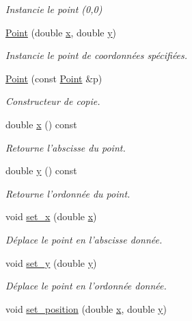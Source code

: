 \begin{DoxyCompactItemize}
\begin{DoxyCompactList}\small\item\em Instancie le point (0,0) \end{DoxyCompactList}\item 
\hyperlink{classPoint_a78b55e8d5466bb8c2cf60fa55f2562ff}{Point} (double \hyperlink{classPoint_a3eef47b1c4849b3395a8f9c658ca7c4a}{x}, double \hyperlink{classPoint_a96e90df6b3c18e64c31abdf196e49ae9}{y})
\begin{DoxyCompactList}\small\item\em Instancie le point de coordonnées spécifiées. \end{DoxyCompactList}\item 
\hyperlink{classPoint_af0c0f20db1616447bc78184ed537ef6e}{Point} (const \hyperlink{classPoint}{Point} \&p)
\begin{DoxyCompactList}\small\item\em Constructeur de copie. \end{DoxyCompactList}\item 
double \hyperlink{classPoint_a3eef47b1c4849b3395a8f9c658ca7c4a}{x} () const 
\begin{DoxyCompactList}\small\item\em Retourne l'abscisse du point. \end{DoxyCompactList}\item 
double \hyperlink{classPoint_a96e90df6b3c18e64c31abdf196e49ae9}{y} () const 
\begin{DoxyCompactList}\small\item\em Retourne l'ordonnée du point. \end{DoxyCompactList}\item 
void \hyperlink{classPoint_adaaf2fe64c78448b3c8d6e121ae3bca0}{set\+\_\+x} (double \hyperlink{classPoint_a3eef47b1c4849b3395a8f9c658ca7c4a}{x})
\begin{DoxyCompactList}\small\item\em Déplace le point en l'abscisse donnée. \end{DoxyCompactList}\item 
void \hyperlink{classPoint_a44bf07535f5dd99991a274833462379b}{set\+\_\+y} (double \hyperlink{classPoint_a96e90df6b3c18e64c31abdf196e49ae9}{y})
\begin{DoxyCompactList}\small\item\em Déplace le point en l'ordonnée donnée. \end{DoxyCompactList}\item 
void \hyperlink{classPoint_ad41fea4a6458fd82d9055b45d0a3c030}{set\+\_\+position} (double \hyperlink{classPoint_a3eef47b1c4849b3395a8f9c658ca7c4a}{x}, double \hyperlink{classPoint_a96e90df6b3c18e64c31abdf196e49ae9}{y})

\end{DoxyCompactItemize}
